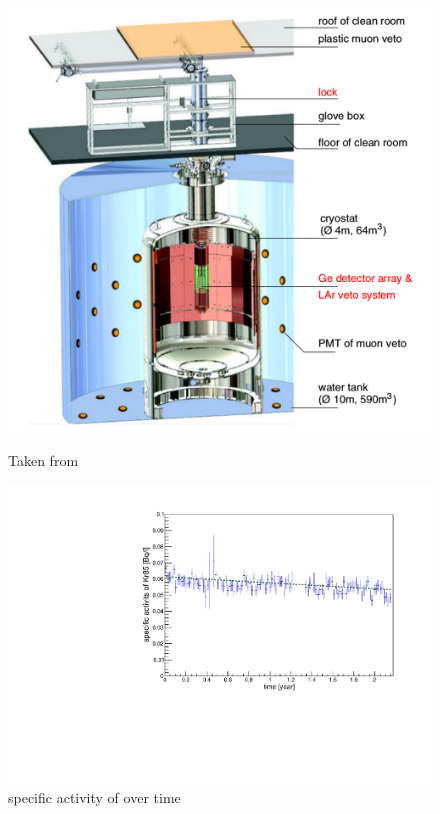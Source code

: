 \begin{figure}[t!]
	\centering
	\begin{minipage}{.5\textwidth}
		\centering
		\includegraphics[width=\textwidth]{./Bilder/GERDAsetupPhaseII.png}
		\caption{Taken from \cite{collaboration_upgrade_2018}}
		\label{fig:GERDASetupPII}
	\end{minipage}%
	\begin{minipage}{.5\textwidth}
		\centering
		\includegraphics[width=\textwidth]{./Bilder/Aktivitaet.pdf}
		\caption{specific activity of \Kr over time}
		\label{fig:activity}
	\end{minipage}
\end{figure}

